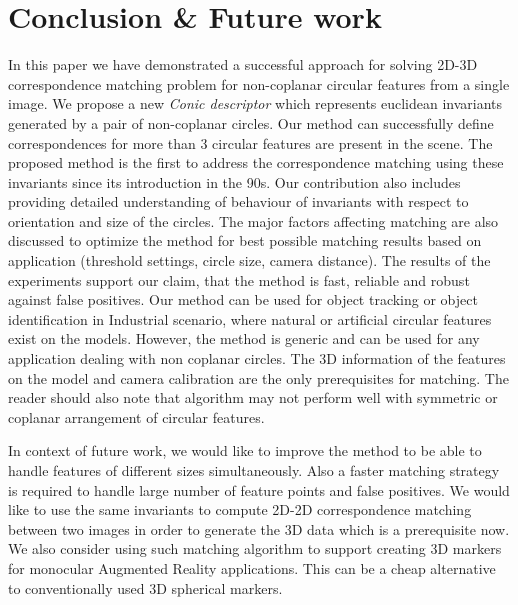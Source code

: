 \documentclass{bmvc2k}
\begin{document}
\section{Conclusion \& Future work }
In this paper we have demonstrated a successful approach for solving 2D-3D correspondence matching problem for non-coplanar circular features from a single image. 
We propose a new \textit{Conic descriptor} which represents euclidean invariants generated by a pair of non-coplanar circles.
Our method can successfully define correspondences for more than 3 circular features are present in the scene. 
The proposed method is the first to address the correspondence matching using these invariants since its introduction in the 90s.
Our contribution also includes providing detailed understanding of behaviour of invariants with respect to orientation and size of the circles. The major factors affecting matching are also discussed to optimize the method for best possible matching results based on application (threshold settings, circle size, camera distance). 
The results of the experiments support our claim, that the method is fast, reliable and robust against false positives.
Our method can be used for object tracking or object identification in Industrial scenario, where natural or artificial circular features exist on the models. However, the method is generic and can be used for any application dealing with non coplanar circles. 
The 3D information of the features on the model and camera calibration are the only prerequisites for matching. 
The reader should also note that algorithm may not perform well with symmetric or coplanar arrangement of circular features. 

\par 
In context of future work, we would like to improve the method to be able to handle features of different sizes simultaneously.
Also a faster matching strategy is required to handle large number of feature points and false positives. We would like to use the same invariants to compute 2D-2D correspondence matching between two images in order to generate the 3D data which is a prerequisite now. We also consider using such matching algorithm to support creating 3D markers for monocular Augmented Reality applications. This can be a cheap alternative to conventionally used 3D spherical markers.  



\end{document}
